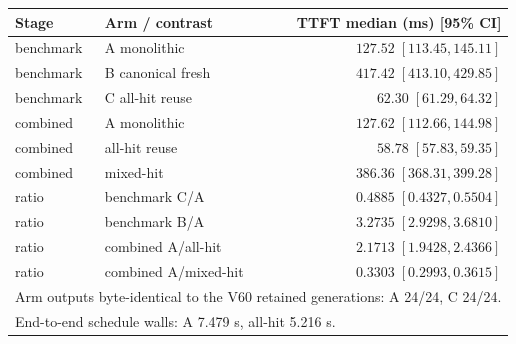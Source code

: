\begin{tabular}{llr}
\toprule
Stage & Arm / contrast & TTFT median (ms) [95\% CI] \\
\midrule
benchmark & A monolithic & $127.52\;[113.45, 145.11]$ \\
benchmark & B canonical fresh & $417.42\;[413.10, 429.85]$ \\
benchmark & C all-hit reuse & $62.30\;[61.29, 64.32]$ \\
\midrule
combined & A monolithic & $127.62\;[112.66, 144.98]$ \\
combined & all-hit reuse & $58.78\;[57.83, 59.35]$ \\
combined & mixed-hit & $386.36\;[368.31, 399.28]$ \\
\midrule
ratio & benchmark C/A & $0.4885\;[0.4327, 0.5504]$ \\
ratio & benchmark B/A & $3.2735\;[2.9298, 3.6810]$ \\
ratio & combined A/all-hit & $2.1713\;[1.9428, 2.4366]$ \\
ratio & combined A/mixed-hit & $0.3303\;[0.2993, 0.3615]$ \\
\midrule
\multicolumn{3}{l}{Arm outputs byte-identical to the V60 retained generations: A 24/24, C 24/24.} \\
\multicolumn{3}{l}{End-to-end schedule walls: A 7.479 s, all-hit 5.216 s.} \\
\bottomrule
\end{tabular}
